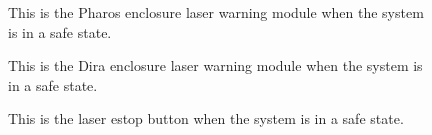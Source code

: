 \documentclass[letterpaper,10pt,english]{sphinxmanual}
\begin{document}
\begin{figure}[htbp]
\centering
\capstart

\noindent{}
\caption{ This is the Pharos enclosure laser warning module when the system is in a safe state.}\label{\detokenize{testing_documentation/Vault-1_laser:id4}}\end{figure}

\begin{figure}[htbp]
\centering
\capstart

\noindent{}
\caption{ This is the Dira enclosure laser warning module when the system is in a safe state.}\label{\detokenize{testing_documentation/Vault-1_laser:id5}}\end{figure}

\begin{figure}[htbp]
\centering
\capstart

\noindent{}
\caption{ This is the laser e\sphinxhyphen{}stop button when the system is in a safe state.}\label{\detokenize{testing_documentation/Vault-1_laser:id6}}\end{figure}
\end{document}
